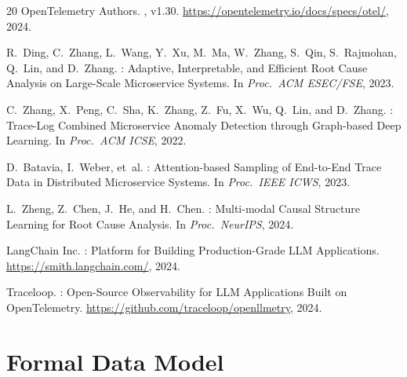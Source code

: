 \documentclass[sigplan,10pt,screen]{acmart}
\begin{document}
\begin{thebibliography}{20}
{OpenTelemetry Authors}.
, v1.30.
\newblock \url{https://opentelemetry.io/docs/specs/otel/}, 2024.

R.~Ding, C.~Zhang, L.~Wang, Y.~Xu, M.~Ma, W.~Zhang, S.~Qin, S.~Rajmohan,
  Q.~Lin, and D.~Zhang.
: Adaptive, Interpretable, and Efficient Root Cause
  Analysis on Large-Scale Microservice Systems.
\newblock In {\em Proc.\ ACM ESEC/FSE}, 2023.

C.~Zhang, X.~Peng, C.~Sha, K.~Zhang, Z.~Fu, X.~Wu, Q.~Lin, and D.~Zhang.
: Trace-Log Combined Microservice Anomaly Detection
  through Graph-based Deep Learning.
\newblock In {\em Proc.\ ACM ICSE}, 2022.

D.~Batavia, I.~Weber, et~al.
: Attention-based Sampling of End-to-End Trace Data in
  Distributed Microservice Systems.
\newblock In {\em Proc.\ IEEE ICWS}, 2023.

L.~Zheng, Z.~Chen, J.~He, and H.~Chen.
: Multi-modal Causal Structure Learning for Root Cause
  Analysis.
\newblock In {\em Proc.\ NeurIPS}, 2024.

{LangChain Inc.}
: Platform for Building Production-Grade {LLM} Applications.
\newblock \url{https://smith.langchain.com/}, 2024.

{Traceloop}.
: Open-Source Observability for {LLM} Applications
  Built on {OpenTelemetry}.
\newblock \url{https://github.com/traceloop/openllmetry}, 2024.

\end{thebibliography}


\appendix

\section{Formal Data Model}
\label{app:datamodel}
\end{document}
